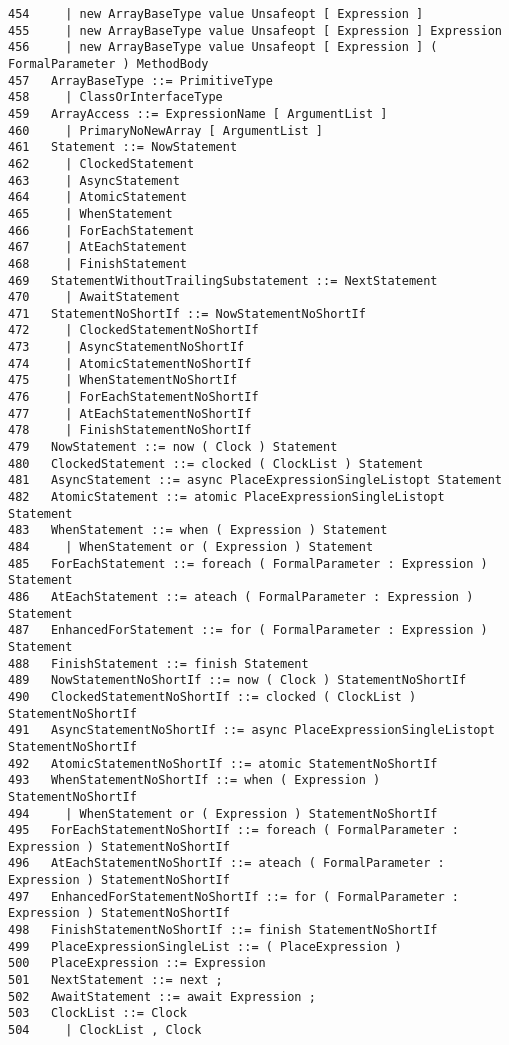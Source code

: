 \begin{verbatim}
454     | new ArrayBaseType value Unsafeopt [ Expression ]
455     | new ArrayBaseType value Unsafeopt [ Expression ] Expression
456     | new ArrayBaseType value Unsafeopt [ Expression ] ( FormalParameter ) MethodBody
457   ArrayBaseType ::= PrimitiveType
458     | ClassOrInterfaceType
459   ArrayAccess ::= ExpressionName [ ArgumentList ]
460     | PrimaryNoNewArray [ ArgumentList ]
461   Statement ::= NowStatement
462     | ClockedStatement
463     | AsyncStatement
464     | AtomicStatement
465     | WhenStatement
466     | ForEachStatement
467     | AtEachStatement
468     | FinishStatement
469   StatementWithoutTrailingSubstatement ::= NextStatement
470     | AwaitStatement
471   StatementNoShortIf ::= NowStatementNoShortIf
472     | ClockedStatementNoShortIf
473     | AsyncStatementNoShortIf
474     | AtomicStatementNoShortIf
475     | WhenStatementNoShortIf
476     | ForEachStatementNoShortIf
477     | AtEachStatementNoShortIf
478     | FinishStatementNoShortIf
479   NowStatement ::= now ( Clock ) Statement
480   ClockedStatement ::= clocked ( ClockList ) Statement
481   AsyncStatement ::= async PlaceExpressionSingleListopt Statement
482   AtomicStatement ::= atomic PlaceExpressionSingleListopt Statement
483   WhenStatement ::= when ( Expression ) Statement
484     | WhenStatement or ( Expression ) Statement
485   ForEachStatement ::= foreach ( FormalParameter : Expression ) Statement
486   AtEachStatement ::= ateach ( FormalParameter : Expression ) Statement
487   EnhancedForStatement ::= for ( FormalParameter : Expression ) Statement
488   FinishStatement ::= finish Statement
489   NowStatementNoShortIf ::= now ( Clock ) StatementNoShortIf
490   ClockedStatementNoShortIf ::= clocked ( ClockList ) StatementNoShortIf
491   AsyncStatementNoShortIf ::= async PlaceExpressionSingleListopt StatementNoShortIf
492   AtomicStatementNoShortIf ::= atomic StatementNoShortIf
493   WhenStatementNoShortIf ::= when ( Expression ) StatementNoShortIf
494     | WhenStatement or ( Expression ) StatementNoShortIf
495   ForEachStatementNoShortIf ::= foreach ( FormalParameter : Expression ) StatementNoShortIf
496   AtEachStatementNoShortIf ::= ateach ( FormalParameter : Expression ) StatementNoShortIf
497   EnhancedForStatementNoShortIf ::= for ( FormalParameter : Expression ) StatementNoShortIf
498   FinishStatementNoShortIf ::= finish StatementNoShortIf
499   PlaceExpressionSingleList ::= ( PlaceExpression )
500   PlaceExpression ::= Expression
501   NextStatement ::= next ;
502   AwaitStatement ::= await Expression ;
503   ClockList ::= Clock
504     | ClockList , Clock

\end{verbatim}
